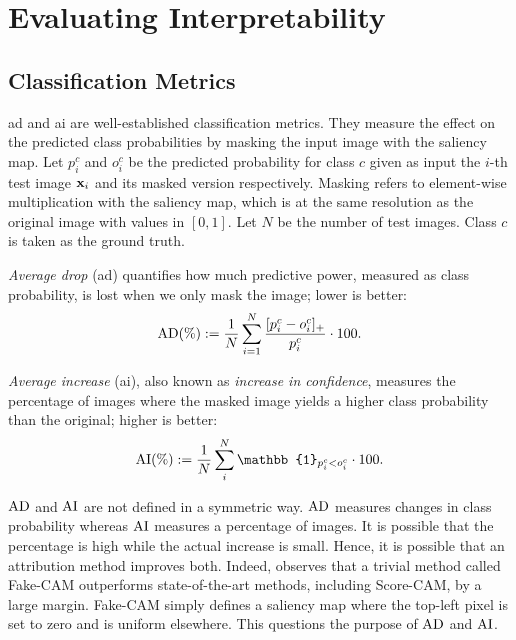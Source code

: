 \section{Evaluating Interpretability}
\subsection{Classification Metrics}
\gls{ad} and \gls{ai} \autocite{chattopadhay2018grad} are 
well-established classification metrics. 
They measure the effect on the predicted class probabilities by masking the input image with the
 saliency map. Let $p^c_i$ and $o^c_i$ be the predicted probability for class $c$ given as input 
 the $i$-th test image $\mathbf{x}_i$ and its masked version respectively. 
Masking refers to element-wise multiplication with the saliency map, which is at the same 
resolution as the original image with values in $[0,1]$. 
Let $N$ be the number of test images. Class $c$ is taken as the ground truth.

\emph{Average drop} (\gls{ad}) quantifies how much predictive power, measured as class probability, 
is lost when we only mask the image; lower is better:
\begin{equation}
	\operatorname{AD}(\%) \mathrel{:=} \frac{1}{N} \sum_{i=1}^N \frac{[p^c_i - o^c_i]_+}{p^c_i} \cdot 100.
\label{eq:ad}
\end{equation}

\emph{Average increase} (\gls{ai}), also known as \emph{increase in confidence}, measures the 
percentage of images where the masked image yields a higher class probability than the original; 
higher is better:
\begin{equation}
	\AI(\%) \defn \frac{1}{N} \sum_i^N \mathbb{1}_{p^c_i < o^c_i} \cdot 100.
\label{eq:ai}
\end{equation}

$\operatorname{AD}$ and $\operatorname{AI}$ are not defined in a symmetric way. $\operatorname{AD}$ measures changes in class probability 
whereas $\operatorname{AI}$ measures a percentage of images. It is possible that the percentage is high while 
the actual increase is small. Hence, it is possible that an attribution method improves both. 
Indeed, \autocite{poppi2021revisiting} observes that a trivial method called Fake-CAM outperforms 
state-of-the-art methods, including Score-CAM, by a large margin. Fake-CAM simply defines a 
saliency map where the top-left pixel is set to zero and is uniform elsewhere. 
This questions the purpose of $\operatorname{AD}$ and $\operatorname{AI}$.

